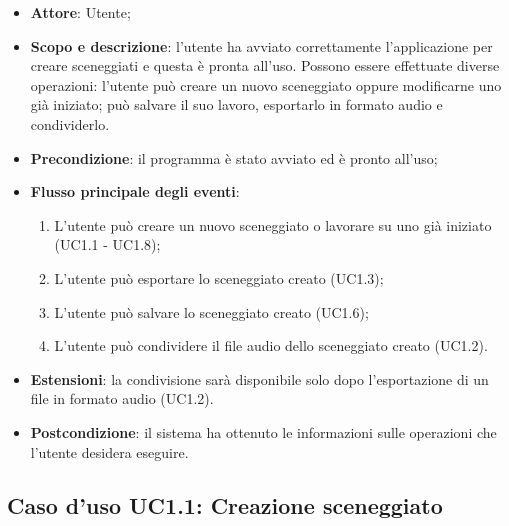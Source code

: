 \begin{itemize}
\item \textbf{Attore}: Utente;
\item \textbf{Scopo e descrizione}: l'utente ha avviato correttamente l'applicazione per creare sceneggiati e questa è pronta all'uso. Possono essere effettuate diverse operazioni: l'utente può creare un nuovo sceneggiato oppure modificarne uno già iniziato; può salvare il suo lavoro, esportarlo in formato audio e condividerlo.
\item \textbf{Precondizione}: il programma è stato avviato ed è pronto all'uso;
\item \textbf{Flusso principale degli eventi}:
\begin{enumerate}
\item L'utente può creare un nuovo sceneggiato o lavorare su uno già iniziato (UC1.1 - UC1.8);
\item L'utente può esportare lo sceneggiato creato (UC1.3);
\item L'utente può salvare lo sceneggiato creato (UC1.6);
\item L'utente può condividere il file audio dello sceneggiato creato (UC1.2).
\end{enumerate}
\item \textbf{Estensioni}: la condivisione sarà disponibile solo dopo l'esportazione di un file in formato audio (UC1.2).
\item \textbf{Postcondizione}: il sistema ha ottenuto le informazioni sulle operazioni che
l'utente desidera eseguire.
\end{itemize}

\subsection{Caso d'uso UC1.1: Creazione sceneggiato}

